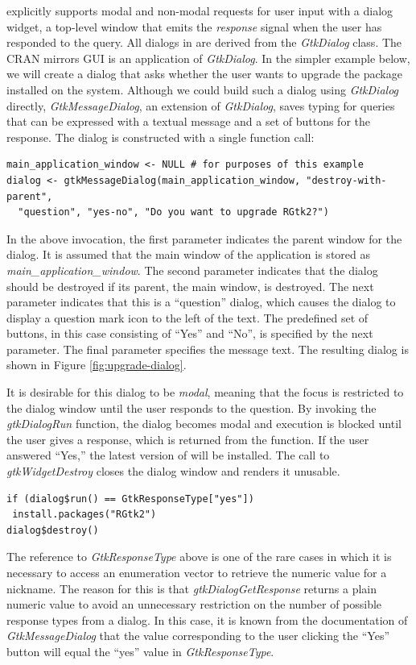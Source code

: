 \documentclass[article]{jss}
\begin{document}
 explicitly supports modal and non-modal requests for user input with
a dialog widget, a top-level window that emits the \emph{response} signal
when the user has responded to the query. All dialogs in  are derived
from the \emph{GtkDialog} class. The CRAN mirrors GUI is an application
of \emph{GtkDialog}. In the simpler example below,
we will create a dialog that asks whether the user wants to upgrade the 
package installed on the system. Although we could build such a dialog using \emph{GtkDialog}
directly, \emph{GtkMessageDialog}, an extension of \emph{GtkDialog}, saves 
typing for queries that can be expressed with a textual message and a set
of buttons for the response. The dialog is constructed with a single function call:
\begin{verbatim}
main_application_window <- NULL # for purposes of this example
dialog <- gtkMessageDialog(main_application_window, "destroy-with-parent", 
  "question", "yes-no", "Do you want to upgrade RGtk2?")
\end{verbatim}
In the above invocation, the first parameter indicates the parent window for
the dialog. It is assumed that the main window of the application is stored 
as \emph{main\_application\_window}. The second parameter indicates that
the dialog should be destroyed if its parent, the main window, is destroyed.
The next parameter indicates that this is a ``question'' dialog, which causes
the dialog to display a question mark icon to the left of the text. The 
predefined set of buttons, in this case consisting of ``Yes'' and ``No'', 
is specified by the next parameter. The final parameter specifies the message text.
The resulting dialog is shown in Figure \ref{fig:upgrade-dialog}.

It is desirable for this dialog to be \emph{modal}, meaning that the focus
is restricted to the dialog window until the user responds to the question. By
invoking the \emph{gtkDialogRun} function, the dialog becomes modal and execution
is blocked until the user gives a response, which is returned from the function.
If the user answered ``Yes,'' the latest version of  will be 
installed. The call to \emph{gtkWidgetDestroy} closes the dialog window and 
renders it unusable.
\begin{verbatim}
if (dialog$run() == GtkResponseType["yes"])
 install.packages("RGtk2")
dialog$destroy()
\end{verbatim}
The reference to \emph{GtkResponseType} above is one of the rare cases in which
it is necessary to access an enumeration vector to retrieve the numeric value
for a nickname. The reason for this is that \emph{gtkDialogGetResponse} returns
a plain numeric value to avoid an unnecessary restriction on the number of 
possible response types from a dialog. In this case, it is known from
the documentation of \emph{GtkMessageDialog} that the value corresponding to
the user clicking the ``Yes'' button will equal the ``yes'' value in \emph{GtkResponseType}.
\end{document}
